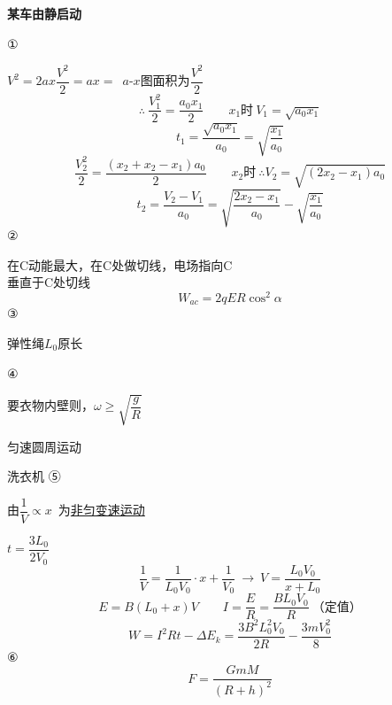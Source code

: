 \textbf{某车由静启动}

①

$V^2=2ax$\quad $\dfrac{V^2}{2}=ax=$\ $a$-$x$图面积为$\dfrac{V^2}{2}$
\[ \therefore\ \frac{V_1^2}{2}=\frac{a_0x_1}{2}\qquad x_1\text{时}\ V_1=\sqrt{a_0x_1}\]
\[ t_1=\frac{\sqrt{a_0x_1}}{a_0}=\sqrt{\frac{x_1}{a_0}} \]
\[ \frac{V_2^2}{2}=\frac{(x_2+x_2-x_1)a_0}{2}\qquad x_2\text{时}\ \therefore V_2=\sqrt{(2x_2-x_1)a_0}\]
\[ t_2=\frac{V_2-V_1}{a_0}=\sqrt{\frac{2x_2-x_1}{a_0}}-\sqrt{\frac{x_1}{a_0}} \]
②

在C动能最大，在C处做切线，电场指向C\\
垂直于C处切线
\[ W_{ac}=2qER\cos^{2}\alpha \]
③

弹性绳\quad $L_0$原长


④

要衣物内壁则，$\omega\ge\sqrt{\dfrac{g}{R}}$

匀速圆周运动

洗衣机
⑤


由$\dfrac{1}{V}\propto x$\ 为\uline{非匀变速运动}

\quad $t=\dfrac{3L_0}{2V_0}$
\[ \frac{1}{V}=\frac{1}{L_0V_0}\cdot x+\frac{1}{V_0}\ \to\ V=\frac{L_0V_0}{x+L_0} \]
\[ E=B(L_0+x)V\qquad I=\frac{E}{R}=\frac{BL_0V_0}{R}\ \text{（定值）} \]
\[ W=I^2Rt-\Delta E_k=\frac{3B^2L_0^2V_0}{2R}-\frac{3mV_0^2}{8} \]
⑥
\[ F=\frac{GmM}{(R+h)^2} \]
